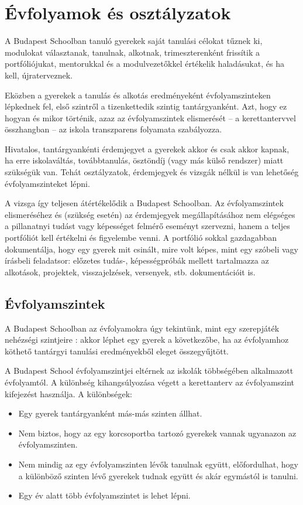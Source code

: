 \section{Évfolyamok és osztályzatok}
\label{sec:evfolyamok_osztalyzatok}
A Budapest Schoolban tanuló gyerekek saját tanulási célokat tűznek ki, modulokat
választanak, tanulnak, alkotnak, trimeszterenként frissítik a portfóliójukat,
mentorukkal és a modulvezetőkkel értékelik haladásukat, és ha kell,
újraterveznek.

Eközben a gyerekek a tanulás és alkotás eredményeként évfolyamszinteken
lépkednek fel,
első szintről a tizenkettedik szintig tantárgyanként.
Azt, hogy ez hogyan és mikor történik, azaz az évfolyamszintek elismerését -- a
kerettantervvel összhangban -- az iskola transzparens folyamata
szabályozza.

Hivatalos, tantárgyankénti érdemjegyet a gyerekek akkor és csak akkor kapnak,
ha erre iskolaváltás, továbbtanulás, ösztöndíj	    (vagy más külső rendszer)
miatt szükségük van.
Tehát osztályzatok, érdemjegyek és vizsgák nélkül is van lehetőség
évfolyamszinteket lépni.

A vizsga így teljesen átértékelődik a Budapest Schoolban.
Az évfolyamszintek elismeréséhez és (szükség esetén) az érdemjegyek
megállapításához
nem elégséges a pillanatnyi tudást vagy képességet felmérő eseményt szervezni,
hanem
a teljes portfóliót kell értékelni és figyelembe venni.
A portfólió sokkal gazdagabban dokumentálja, hogy egy gyerek mit csinált, mire
volt képes, mint egy szóbeli vagy írásbeli feladatsor: előzetes tudás-,
képességpróbák
mellett tartalmazza az alkotások, projektek, visszajelzések, versenyek, stb.
dokumentációit is.

\subsection{Évfolyamszintek}
\label{sec:evfolyamok}

A Budapest Schoolban az évfolyamokra úgy tekintünk, mint egy szerepjáték
nehézségi
szintjeire \citep{wiki:game_levels}: akkor léphet egy gyerek a következőbe, ha
az
évfolyamhoz köthető tantárgyi tanulási eredményekből eleget összegyűjtött.
  

A Budapest School évfolyamszintjei eltérnek az iskolák többségében alkalmazott
évfolyamtól. A különbség kihangsúlyozása végett a kerettanterv az évfolyamszint
kifejezést használja. A különbségek:

\begin{itemize}
      \item Egy gyerek tantárgyanként más-más szinten állhat.
      \item Nem biztos, hogy az egy korcsoportba tartozó gyerekek vannak
            ugyanazon az évfolyamszinten.

      \item Nem mindig az egy évfolyamszinten lévők tanulnak együtt,
            előfordulhat, hogy a különböző szinten lévő gyerekek tudnak együtt
            és akár
            egymástól is tanulni.

      \item Egy év alatt több évfolyamszintet is lehet lépni.
\end{itemize}

